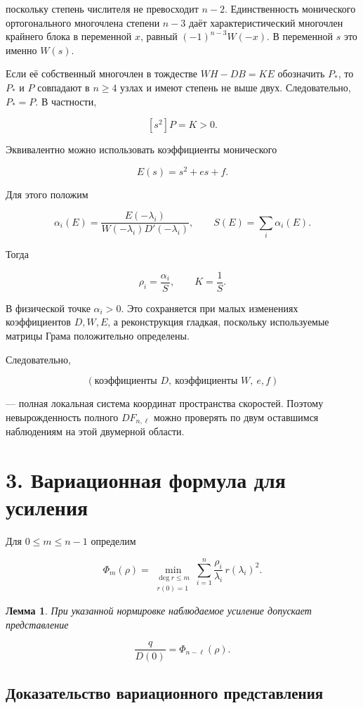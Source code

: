 \documentclass[11pt,a4paper]{article}
\newtheorem{lem}{Лемма}
\begin{document}
поскольку степень числителя не превосходит \(n-2\). Единственность монического ортогонального многочлена степени \(n-3\) даёт характеристический многочлен крайнего блока в переменной \(x\), равный \((-1)^{n-3}W(-x)\). В переменной \(s\) это именно \(W(s)\).

Если её собственный многочлен в тождестве \(WH-DB=KE\) обозначить \(P_*\), то \(P_*\) и \(P\) совпадают в \(n\ge4\) узлах и имеют степень не выше двух. Следовательно, \(P_*=P\). В частности,

\[
[s^2]P=K>0.
\]

Эквивалентно можно использовать коэффициенты монического

\[
E(s)=s^2+es+f.
\]

Для этого положим

\[
\alpha_i(E)=
\frac{E(-\lambda_i)}
{W(-\lambda_i)D'(-\lambda_i)},\qquad
S(E)=\sum_i\alpha_i(E).
\]

Тогда

\[
\rho_i=\frac{\alpha_i}{S},\qquad K=\frac1S.
\tag{2}
\]

В физической точке \(\alpha_i>0\). Это сохраняется при малых изменениях коэффициентов \(D,W,E\), а реконструкция гладкая, поскольку используемые матрицы Грама положительно определены.

Следовательно,

\[
(\text{коэффициенты }D,\ \text{коэффициенты }W,\ e,f)
\]

— полная локальная система координат пространства скоростей. Поэтому невырожденность полного \(DF_{n,\ell}\) можно проверять по двум оставшимся наблюдениям на этой двумерной области.

\section*{\color{ink} 3. Вариационная формула для усиления}

Для \(0\le m\le n-1\) определим

\[
\Phi_m(\rho)=
\min_{\substack{\deg r\le m\\r(0)=1}}
\sum_{i=1}^n
\frac{\rho_i}{\lambda_i}\,r(\lambda_i)^2.
\tag{3}
\]

\begin{lem}\label{lem:energy}При указанной нормировке наблюдаемое усиление допускает представление

\[
\boxed{\frac q{D(0)}=\Phi_{n-\ell}(\rho).}
\tag{4}
\]\end{lem}

\subsection*{Доказательство вариационного представления}
\end{document}
